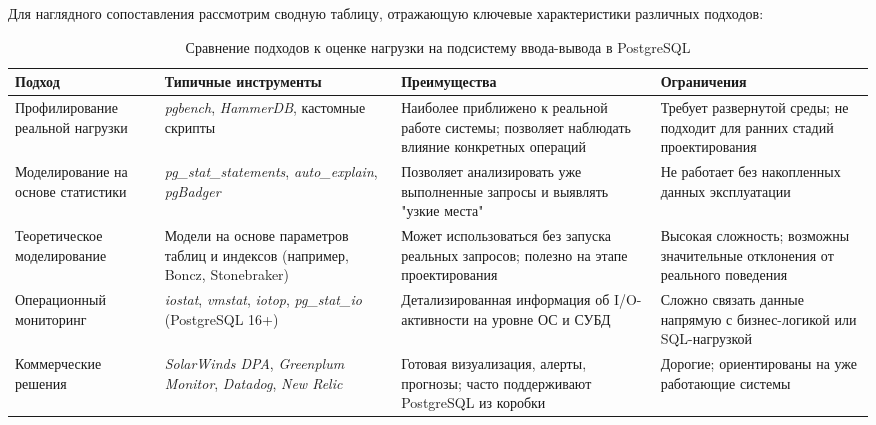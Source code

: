 Для наглядного сопоставления рассмотрим сводную таблицу, отражающую ключевые характеристики различных подходов:

\begin{table}[H]
\centering
\small
\begin{tabularx}{\textwidth}{@{}p{3.5cm}X>{\raggedright\arraybackslash}p{4.2cm}>{\raggedright\arraybackslash}p{3.5cm}@{}}
\toprule
\textbf{Подход} & \textbf{Типичные инструменты} & \textbf{Преимущества} & \textbf{Ограничения} \\
\midrule
Профилирование реальной нагрузки & \textit{pgbench}, \textit{HammerDB}, кастомные скрипты & Наиболее приближено к реальной работе системы; позволяет наблюдать влияние конкретных операций & Требует развернутой среды; не подходит для ранних стадий проектирования \\
\addlinespace
Моделирование на основе статистики & \textit{pg\_stat\_statements}, \textit{auto\_explain}, \textit{pgBadger} & Позволяет анализировать уже выполненные запросы и выявлять "узкие места" & Не работает без накопленных данных эксплуатации \\
\addlinespace
Теоретическое моделирование & Модели на основе параметров таблиц и индексов (например, Boncz, Stonebraker) & Может использоваться без запуска реальных запросов; полезно на этапе проектирования & Высокая сложность; возможны значительные отклонения от реального поведения \\
\addlinespace
Операционный мониторинг & \textit{iostat}, \textit{vmstat}, \textit{iotop}, \textit{pg\_stat\_io} (PostgreSQL 16+) & Детализированная информация об I/O-активности на уровне ОС и СУБД & Сложно связать данные напрямую с бизнес-логикой или SQL-нагрузкой \\
\addlinespace
Коммерческие решения & \textit{SolarWinds DPA}, \textit{Greenplum Monitor}, \textit{Datadog}, \textit{New Relic} & Готовая визуализация, алерты, прогнозы; часто поддерживают PostgreSQL из коробки & Дорогие; ориентированы на уже работающие системы \\
\bottomrule
\end{tabularx}
\caption{Сравнение подходов к оценке нагрузки на подсистему ввода-вывода в PostgreSQL}
\label{tab:io_approaches}
\end{table}
